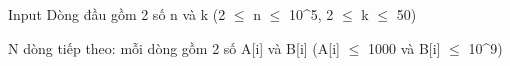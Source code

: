 Input
Dòng đầu gồm 2 số n và k (2 $\le$  n  $\le$  10^5, 2  $\le$  k  $\le$  50)   



    N dòng tiếp theo: mỗi dòng gồm 2 số A[i] và B[i] (A[i]  $\le$  1000 và B[i]  $\le$  10^9)